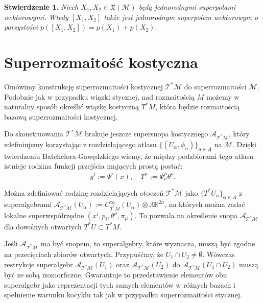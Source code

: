 \documentclass[11pt,a4paper]{report}
\newtheorem{proposition}[theorem]{Stwierdzenie}
\theoremstyle{definition}
\begin{document}
\begin{proposition}
 Niech $X_1, X_2 \in \mathfrak {X} (\mathcal{M})$ będą jednorodnymi superpolami wektorowymi. Wtedy $[X_1, X_2]$ także jest jednorodnym superpolem wektorowym o parzystości $p([X_1, X_2]) = p(X_1) + p(X_2).$
\end{proposition}

\section{Superrozmaitość kostyczna}

Omówimy konstrukcję superrozmaitości kostycznej $\mathcal{T^*M}$ do superrozmaitości $\mathcal{M}$. Podobnie jak w przypadku wiązki stycznej, nad rozmaitością $M$ możemy w naturalny sposób określić wiązkę kostyczną $T^*M$, która będzie rozmaitością bazową superrozmaitości kostycznej.

Do skonstruowania $\mathcal{T^*M}$ brakuje jeszcze supersnopa kostycznego $\mathcal{A_{T^*M}}$, który zdefiniujemy korzystając z rozdzielającego atlasu $\{ (U_\alpha, \phi_\alpha ) \}_{\alpha \in A }$ na $\mathcal{M}$. Dzięki twierdzeniu Batchelora-Gawędzkiego wiemy, że między podzbiorami tego atlasu istnieje rodzina funkcji przejścia  mających prostą postać:
\begin{equation*}
y^i := \Psi^i (x), \quad \Upsilon^\mu := \Psi^\mu_\nu \theta^\nu.
\end{equation*}

Można zdefiniować rodzinę rozdzielających otoczeń $\mathcal{T^*M}$ jako $\{ T^*U_\alpha \}_{\alpha \in A}$ z superalgebrami $\mathcal{A_{T^*M}}(U_\alpha) := C^\infty_{T^*M}(U_\alpha) \otimes \Lambda \mathbb{R}^{2n}$, na których można zadać lokalne superwspółrzędne $(x^i, p_i, \theta^\mu, \pi_\mu)$. To pozwala na określenie snopa $\mathcal{A_{T^*M}}$ dla dowolnych otwartych $T^*U \subset T^*M.$

Jeśli $\mathcal{A_{T^*M}}$ ma być snopem, to superalgebry, które wyznacza, muszą być zgodne na przecięciach zbiorów otwartych. Przypuśćmy, że $U_1 \cap U_2 \neq \emptyset$. Wówczas restrykcje superalgebr $\mathcal{A_{T^*M}}(U_1)$ oraz $\mathcal{A_{T^*M}}(U_2)$ do $\mathcal{A_{T^*M}}(U_1 \cap U_2)$ muszą być ze sobą izomorficzne. Gwarantuje to przedstawienie elementów obu superalgebr jako reprezentacji tych samych elementów w różnych bazach i spełnienie warunku kocyklu tak jak w przypadku superrozmaitości stycznej.
\end{document}
